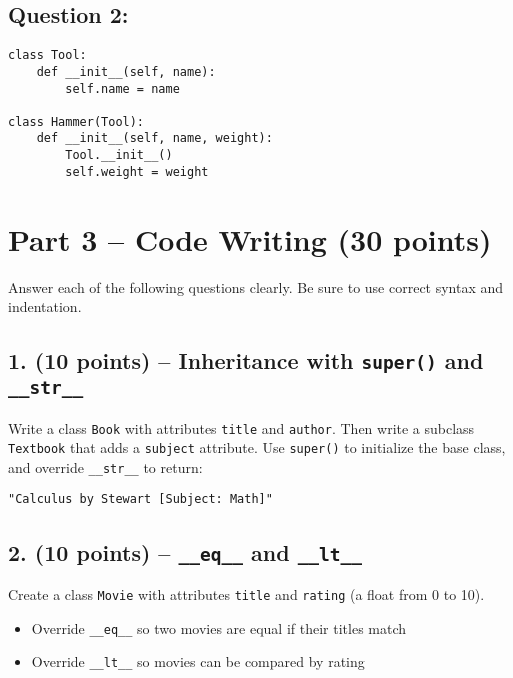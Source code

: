 \documentclass[11pt]{article}
\begin{document}
\vspace{3cm}

\subsection*{Question 2:}
\begin{verbatim}
class Tool:
    def __init__(self, name):
        self.name = name

class Hammer(Tool):
    def __init__(self, name, weight):
        Tool.__init__()
        self.weight = weight
\end{verbatim}

\vspace{3cm}

\newpage

\section*{Part 3 – Code Writing (30 points)}

Answer each of the following questions clearly. Be sure to use correct syntax and indentation.

\subsection*{1. (10 points) – Inheritance with \texttt{super()} and \texttt{\_\_str\_\_}}

Write a class \texttt{Book} with attributes \texttt{title} and \texttt{author}. Then write a subclass \texttt{Textbook} that adds a \texttt{subject} attribute. Use \texttt{super()} to initialize the base class, and override \texttt{\_\_str\_\_} to return:

\texttt{"Calculus by Stewart [Subject: Math]"}

\vspace{6cm}
\newpage

\subsection*{2. (10 points) – \texttt{\_\_eq\_\_} and \texttt{\_\_lt\_\_}}

Create a class \texttt{Movie} with attributes \texttt{title} and \texttt{rating} (a float from 0 to 10).

\begin{itemize}
    \item Override \texttt{\_\_eq\_\_} so two movies are equal if their titles match
    \item Override \texttt{\_\_lt\_\_} so movies can be compared by rating
\end{itemize}
\end{document}
